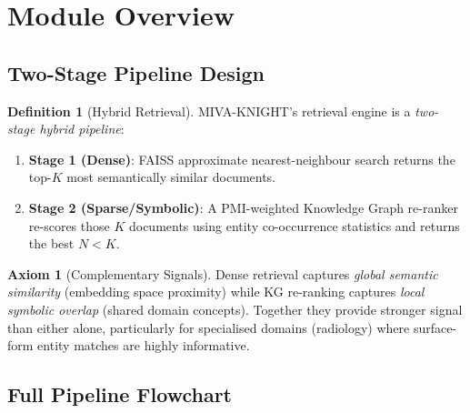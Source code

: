 \documentclass[12pt,a4paper]{article}
\theoremstyle{definition}
\newtheorem{definition}[theorem]{Definition}
\newtheorem{axiom}[theorem]{Axiom}
\theoremstyle{remark}
\begin{document}
\tableofcontents
\newpage

\section{Module Overview}

\subsection{Two-Stage Pipeline Design}

\begin{definition}[Hybrid Retrieval]
MIVA-KNIGHT's retrieval engine is a \emph{two-stage hybrid pipeline}:
\begin{enumerate}
  \item \textbf{Stage 1 (Dense)}: FAISS approximate nearest-neighbour search
        returns the top-$K$ most semantically similar documents.
  \item \textbf{Stage 2 (Sparse/Symbolic)}: A PMI-weighted Knowledge Graph
        re-ranker re-scores those $K$ documents using entity co-occurrence
        statistics and returns the best $N < K$.
\end{enumerate}
\end{definition}

\begin{axiom}[Complementary Signals]
Dense retrieval captures \emph{global semantic similarity} (embedding space
proximity) while KG re-ranking captures \emph{local symbolic overlap}
(shared domain concepts). Together they provide stronger signal than either
alone, particularly for specialised domains (radiology) where surface-form
entity matches are highly informative.
\end{axiom}

\subsection{Full Pipeline Flowchart}
\end{document}
